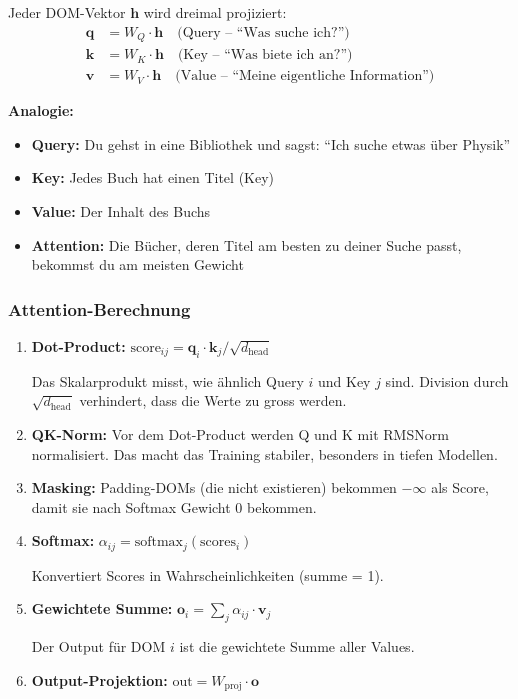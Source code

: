 \documentclass[12pt, a4paper]{article}
\begin{document}
Jeder DOM-Vektor $\mathbf{h}$ wird dreimal projiziert:
\begin{align}
    \mathbf{q} &= W_Q \cdot \mathbf{h} \quad \text{(Query -- ``Was suche ich?'')} \\
    \mathbf{k} &= W_K \cdot \mathbf{h} \quad \text{(Key -- ``Was biete ich an?'')} \\
    \mathbf{v} &= W_V \cdot \mathbf{h} \quad \text{(Value -- ``Meine eigentliche Information'')}
\end{align}

\textbf{Analogie:}
\begin{itemize}
    \item \textbf{Query:} Du gehst in eine Bibliothek und sagst: ``Ich suche etwas \"uber Physik''
    \item \textbf{Key:} Jedes Buch hat einen Titel (Key)
    \item \textbf{Value:} Der Inhalt des Buchs
    \item \textbf{Attention:} Die B\"ucher, deren Titel am besten zu deiner Suche passt,
          bekommst du am meisten Gewicht
\end{itemize}

\subsubsection{Attention-Berechnung}

\begin{enumerate}
\item \textbf{Dot-Product:} $\text{score}_{ij} = \mathbf{q}_i \cdot \mathbf{k}_j / \sqrt{d_\text{head}}$

Das Skalarprodukt misst, wie \"ahnlich Query $i$ und Key $j$ sind.
Division durch $\sqrt{d_\text{head}}$ verhindert, dass die Werte zu gross werden.

\item \textbf{QK-Norm:} Vor dem Dot-Product werden Q und K mit RMSNorm normalisiert.
Das macht das Training stabiler, besonders in tiefen Modellen.

\item \textbf{Masking:} Padding-DOMs (die nicht existieren) bekommen $-\infty$ als Score,
damit sie nach Softmax Gewicht 0 bekommen.

\item \textbf{Softmax:} $\alpha_{ij} = \text{softmax}_j(\text{scores}_i)$

Konvertiert Scores in Wahrscheinlichkeiten (summe = 1).

\item \textbf{Gewichtete Summe:} $\mathbf{o}_i = \sum_j \alpha_{ij} \cdot \mathbf{v}_j$

Der Output f\"ur DOM $i$ ist die gewichtete Summe aller Values.

\item \textbf{Output-Projektion:} $\text{out} = W_\text{proj} \cdot \mathbf{o}$
\end{enumerate}
\end{document}
